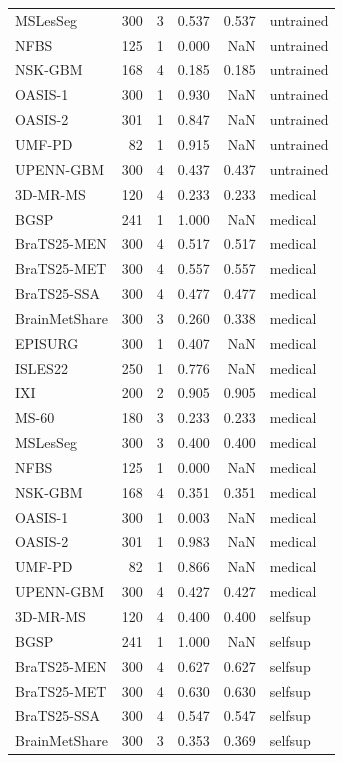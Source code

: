 \begin{tabular}{lrrrrl}
MSLesSeg & 300 & 3 & 0.537 & 0.537 & untrained \\
NFBS & 125 & 1 & 0.000 & NaN & untrained \\
NSK-GBM & 168 & 4 & 0.185 & 0.185 & untrained \\
OASIS-1 & 300 & 1 & 0.930 & NaN & untrained \\
OASIS-2 & 301 & 1 & 0.847 & NaN & untrained \\
UMF-PD & 82 & 1 & 0.915 & NaN & untrained \\
UPENN-GBM & 300 & 4 & 0.437 & 0.437 & untrained \\
3D-MR-MS & 120 & 4 & 0.233 & 0.233 & medical \\
BGSP & 241 & 1 & 1.000 & NaN & medical \\
BraTS25-MEN & 300 & 4 & 0.517 & 0.517 & medical \\
BraTS25-MET & 300 & 4 & 0.557 & 0.557 & medical \\
BraTS25-SSA & 300 & 4 & 0.477 & 0.477 & medical \\
BrainMetShare & 300 & 3 & 0.260 & 0.338 & medical \\
EPISURG & 300 & 1 & 0.407 & NaN & medical \\
ISLES22 & 250 & 1 & 0.776 & NaN & medical \\
IXI & 200 & 2 & 0.905 & 0.905 & medical \\
MS-60 & 180 & 3 & 0.233 & 0.233 & medical \\
MSLesSeg & 300 & 3 & 0.400 & 0.400 & medical \\
NFBS & 125 & 1 & 0.000 & NaN & medical \\
NSK-GBM & 168 & 4 & 0.351 & 0.351 & medical \\
OASIS-1 & 300 & 1 & 0.003 & NaN & medical \\
OASIS-2 & 301 & 1 & 0.983 & NaN & medical \\
UMF-PD & 82 & 1 & 0.866 & NaN & medical \\
UPENN-GBM & 300 & 4 & 0.427 & 0.427 & medical \\
3D-MR-MS & 120 & 4 & 0.400 & 0.400 & selfsup \\
BGSP & 241 & 1 & 1.000 & NaN & selfsup \\
BraTS25-MEN & 300 & 4 & 0.627 & 0.627 & selfsup \\
BraTS25-MET & 300 & 4 & 0.630 & 0.630 & selfsup \\
BraTS25-SSA & 300 & 4 & 0.547 & 0.547 & selfsup \\
BrainMetShare & 300 & 3 & 0.353 & 0.369 & selfsup \\

\end{tabular}
